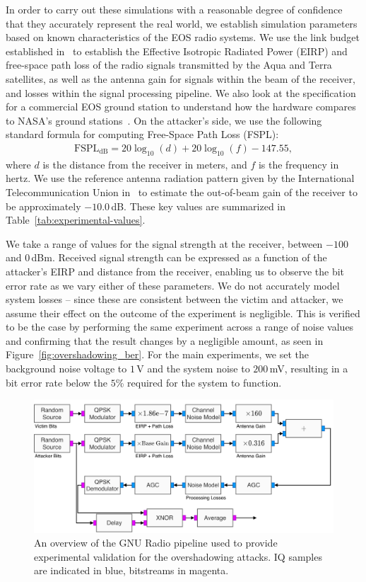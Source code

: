 In order to carry out these simulations with a reasonable degree of confidence that they accurately represent the real world, we establish simulation parameters based on known characteristics of the EOS radio systems.
We use the link budget established in~\cite{quinnNew2003} to establish the Effective Isotropic Radiated Power (EIRP) and free-space path loss of the radio signals transmitted by the Aqua and Terra satellites, as well as the antenna gain for signals within the beam of the receiver, and losses within the signal processing pipeline.
We also look at the specification for a commercial EOS ground station to understand how the hardware compares to NASA's ground stations~\cite{dartcomsystemsltdXBand2021}.
On the attacker's side, we use the following standard formula for computing Free-Space Path Loss (FSPL):
\begin{align}
    \text{FSPL}_{\text{dB}} = 20\log_{10}(d) + 20\log_{10}(f) - 147.55, \label{eq:fspl}
\end{align}
where $d$ is the distance from the receiver in meters, and $f$ is the frequency in hertz.
We use the reference antenna radiation pattern given by the International Telecommunication Union in~\cite{itu2022antenna} to estimate the out-of-beam gain of the receiver to be approximately $-10.0$\,dB.
These key values are summarized in Table~\ref{tab:experimental-values}.

We take a range of values for the signal strength at the receiver, between $-100$ and $0$\,dBm.
Received signal strength can be expressed as a function of the attacker's EIRP and distance from the receiver, enabling us to observe the bit error rate as we vary either of these parameters.
We do not accurately model system losses -- since these are consistent between the victim and attacker, we assume their effect on the outcome of the experiment is negligible.
This is verified to be the case by performing the same experiment across a range of noise values and confirming that the result changes by a negligible amount, as seen in Figure~\ref{fig:overshadowing_ber}.
For the main experiments, we set the background noise voltage to $1\,$\textmu V and the system noise to $200$\,mV, resulting in a bit error rate below the $5$\% required for the system to function.

\begin{figure}
    \centering
    \includegraphics[width=\columnwidth]{diagrams/overshadowing_pipeline.pdf}
    \caption{An overview of the GNU Radio pipeline used to provide experimental validation for the overshadowing attacks. IQ samples are indicated in blue, bitstreams in magenta.}
    \label{fig:overshadowing_pipeline}
\end{figure}


